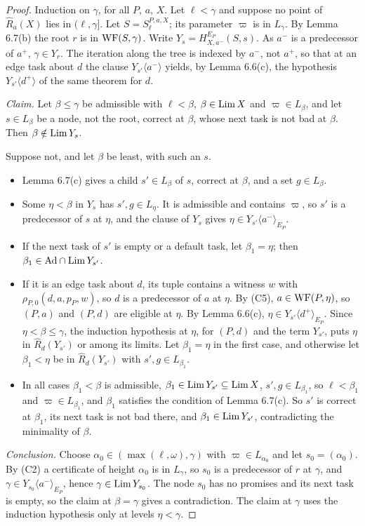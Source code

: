 \documentclass[11pt]{article}
\begin{document}
\begin{proof}
Induction on $\gamma$, for all $P$, $a$, $X$. Let $\ell < \gamma$ and suppose no point of $\widehat R_a(X)$ lies in
$(\ell, \gamma]$. Let $S = S^{P,a,X}_\ell$; its parameter $\varpi$ is in $L_\gamma$. By Lemma 6.7(b) the root $r$ is in
$\mathrm{WF}(S,\gamma)$. Write $Y_s = H^{E_P}_{X,a^-}(S,s)$. As $a^-$ is a predecessor of $a^+$, $\gamma \in Y_r$. The
iteration along the tree is indexed by $a^-$, not $a^+$, so that at an edge task about $d$ the clause $Y_{s'}\langle
a^-\rangle$ yields, by Lemma 6.6(c), the hypothesis $Y_{s'}\langle d^+\rangle$ of the same theorem for $d$.

\emph{Claim.} Let $\beta \le \gamma$ be admissible with $\ell < \beta$, $\beta \in \mathrm{Lim}\, X$ and $\varpi \in L_\beta$, and
let $s \in L_\beta$ be a node, not the root, correct at $\beta$, whose next task is not bad at $\beta$. Then $\beta
\notin \mathrm{Lim}\, Y_s$.

Suppose not, and let $\beta$ be least, with such an $s$.
\begin{itemize}
\item Lemma 6.7(c) gives a child $s' \in L_\beta$ of $s$, correct at $\beta$, and a set $g \in L_\beta$.
\item Some $\eta < \beta$ in $Y_s$ has $s', g \in L_\eta$. It is admissible and contains $\varpi$, so $s'$ is a
  predecessor of $s$ at $\eta$, and the clause of $Y_s$ gives $\eta \in Y_{s'}\langle a^-\rangle_{E_P}$.
\item If the next task of $s'$ is empty or a default task, let $\beta_1 = \eta$; then $\beta_1 \in \mathrm{Ad} \cap \mathrm{Lim}\,
  Y_{s'}$.
\item If it is an edge task about $d$, its tuple contains a witness $w$ with $\rho_{P,0}(d,a,p_P,w)$, so $d$ is a
  predecessor of $a$ at $\eta$. By (C5), $a \in \mathrm{WF}(P,\eta)$, so $(P,a)$ and $(P,d)$ are eligible at $\eta$. By Lemma
  6.6(c), $\eta \in Y_{s'}\langle d^+\rangle_{E_P}$. Since $\eta < \beta \le \gamma$, the induction hypothesis at
  $\eta$, for $(P,d)$ and the term $Y_{s'}$, puts $\eta$ in $\widehat R_d(Y_{s'})$ or among its limits. Let $\beta_1 =
  \eta$ in the first case, and otherwise let $\beta_1 < \eta$ be in $\widehat R_d(Y_{s'})$ with $s', g \in L_{\beta_1}$.
\item In all cases $\beta_1 < \beta$ is admissible, $\beta_1 \in \mathrm{Lim}\, Y_{s'} \subseteq \mathrm{Lim}\, X$, $s', g \in
  L_{\beta_1}$, so $\ell < \beta_1$ and $\varpi \in L_{\beta_1}$, and $\beta_1$ satisfies the condition of Lemma 6.7(c).
  So $s'$ is correct at $\beta_1$, its next task is not bad there, and $\beta_1 \in \mathrm{Lim}\, Y_{s'}$, contradicting the
  minimality of $\beta$.
\end{itemize}

\emph{Conclusion.} Choose $\alpha_0 \in (\max(\ell,\omega), \gamma)$ with $\varpi \in L_{\alpha_0}$ and let $s_0 =
(\alpha_0)$. By (C2) a certificate of height $\alpha_0$ is in $L_\gamma$, so $s_0$ is a predecessor of $r$ at $\gamma$,
and $\gamma \in Y_{s_0}\langle a^-\rangle_{E_P}$, hence $\gamma \in \mathrm{Lim}\, Y_{s_0}$. The node $s_0$ has no promises and its
next task is empty, so the claim at $\beta = \gamma$ gives a contradiction. The claim at $\gamma$ uses the induction
hypothesis only at levels $\eta < \gamma$.
\end{proof}
\end{document}
